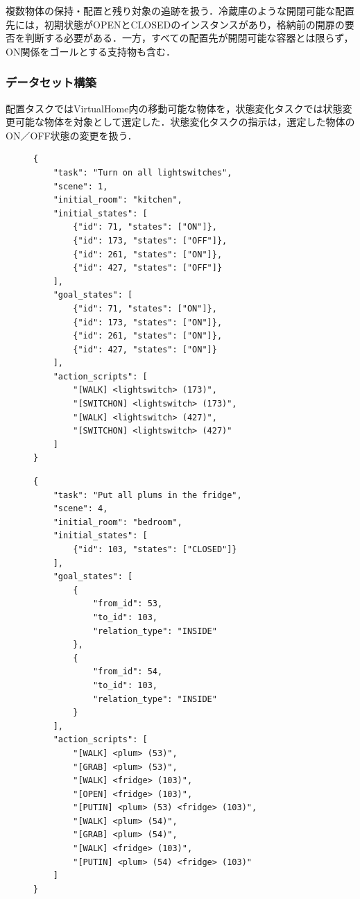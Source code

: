 複数物体の保持・配置と残り対象の追跡を扱う．冷蔵庫のような開閉可能な配置先には，初期状態がOPENとCLOSEDのインスタンスがあり，格納前の開扉の要否を判断する必要がある．一方，すべての配置先が開閉可能な容器とは限らず，ON関係をゴールとする支持物も含む．

\subsubsection{データセット構築}
配置タスクではVirtualHome内の移動可能な物体を，状態変化タスクでは状態変更可能な物体を対象として選定した．状態変化タスクの指示は，選定した物体のON／OFF状態の変更を扱う．

\begin{figure}[tb]
    \begin{lstlisting}[caption=状態変化タスクのデータセット例, label=state-change-task]
{
    "task": "Turn on all lightswitches",
    "scene": 1,
    "initial_room": "kitchen",
    "initial_states": [
        {"id": 71, "states": ["ON"]},
        {"id": 173, "states": ["OFF"]},
        {"id": 261, "states": ["ON"]},
        {"id": 427, "states": ["OFF"]}
    ],
    "goal_states": [
        {"id": 71, "states": ["ON"]},
        {"id": 173, "states": ["ON"]},
        {"id": 261, "states": ["ON"]},
        {"id": 427, "states": ["ON"]}
    ],
    "action_scripts": [
        "[WALK] <lightswitch> (173)",
        "[SWITCHON] <lightswitch> (173)",
        "[WALK] <lightswitch> (427)",
        "[SWITCHON] <lightswitch> (427)"
    ]
}
    \end{lstlisting}
\end{figure}

\begin{figure}[tb]
    \begin{lstlisting}[caption=配置タスクのデータセット例, label=placement-task]
{
    "task": "Put all plums in the fridge",
    "scene": 4,
    "initial_room": "bedroom",
    "initial_states": [
        {"id": 103, "states": ["CLOSED"]}
    ],
    "goal_states": [
        {
            "from_id": 53,
            "to_id": 103,
            "relation_type": "INSIDE"
        },
        {
            "from_id": 54,
            "to_id": 103,
            "relation_type": "INSIDE"
        }
    ],
    "action_scripts": [
        "[WALK] <plum> (53)",
        "[GRAB] <plum> (53)",
        "[WALK] <fridge> (103)",
        "[OPEN] <fridge> (103)",
        "[PUTIN] <plum> (53) <fridge> (103)",
        "[WALK] <plum> (54)",
        "[GRAB] <plum> (54)",
        "[WALK] <fridge> (103)",
        "[PUTIN] <plum> (54) <fridge> (103)"
    ]
}
    \end{lstlisting}
\end{figure}


